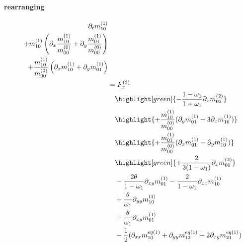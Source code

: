 \documentclass{article}
\begin{document}
  \paragraph{rearranging}
  \begin{equation*}
    \begin{aligned}
    \partial_t m_{10}^{(1)}
    &\\\quad
    + m_{10}^{(1)}\left(\partial_x \frac{  m_{10}^{(1)}}{m_{00}^{(0)}} + \partial_y \frac{  m_{01}^{(1)}}{m_{00}^{(0)}} \right)
    &\\\quad
    + \frac{ m_{10}^{(1)}}{m_{00}^{(0)}} \left(\partial_x m_{10}^{(1)} + \partial_y  m_{01}^{(1)}\right)
    &\\\quad
     &=
      F_x^{(3)}
      \\&\quad
      \highlight[green]{-\frac{1-\omega_1}{1+\omega_1} \partial_x m_{02}^{(2)}}
      \\&\quad
      \highlight{+ \frac{m_{10}^{(1)}}{m_{00}^{(0)}} (\partial_y m_{01}^{(1)} + 3 \partial_x m_{10}^{(1)})}
      \\&\quad
      \highlight{+ \frac{m_{01}^{(1)}}{m_{00}^{(0)}} (\partial_x m_{01}^{(1)} - \partial_y m_{10}^{(1)})}
      \\&\quad
      \highlight[green]{+ \frac{ 2}{3(1-\omega_1)}\partial_x m_{00}^{(2)}}
      \\&\quad
      - \frac{2\theta}{1-\omega_1}\partial_{xy} m_{01}^{(1)} - \frac{2}{1-\omega_1}\partial_{xx} m_{10}^{(1)}
      \\&\quad
      + \frac{\theta}{\omega_1}\partial_{yy} m_{10}^{(1)}
      \\&\quad
      + \frac{\theta}{\omega_1}\partial_{xy} m_{01}^{(1)}
      \\&\quad
      - \frac{1}{2} (\partial_{xx} m_{10}^{eq(1)} + \partial_{yy} m_{12}^{eq(1)} + 2\partial_{xy} m_{21}^{eq(1)})
    \end{aligned}
  \end{equation*}
\end{document}
